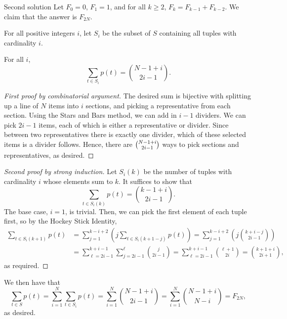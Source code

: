 \begin{customenv}{Second solution}
    Let $F_0=0$, $F_1=1$, and for all $k\ge 2$, $F_k=F_{k-1}+F_{k-2}$. We claim that the answer is $F_{2N}$.

    For all positive integers $i$, let $S_i$ be the subset of $S$ containing all tuples with cardinality $i$.
    \begin{iclaim*}
        For all $i$, \[\sum_{t\in S_i}p(t)=\binom{N-1+i}{2i-1}.\]
    \end{iclaim*}
    \begin{proof}[First proof by combinatorial argument]
        The desired sum is bijective with splitting up a line of $N$ items into $i$ sections, and picking a representative from each section. Using the Stars and Bars method, we can add in $i-1$ dividers. We can pick $2i-1$ items, each of which is either a representative or divider. Since between two representatives there is exactly one divider, which of these selected items is a divider follows. Hence, there are $\tbinom{N-1+i}{2i-1}$ ways to pick sections and representatives, as desired.
    \end{proof}
    \begin{proof}[Second proof by strong induction]
        Let $S_i(k)$ be the number of tuples with cardinality $i$ whose elements sum to $k$. It suffices to show that \[\sum_{t\in S_i(k)}p(t)=\binom{k-1+i}{2i-1}.\]
        The base case, $i=1$, is trivial. Then, we can pick the first element of each tuple first, so by the Hockey Stick Identity,
        \begin{align*}
            \sum_{t\in S_i(k+1)}p(t)&=\sum_{j=1}^{k-i+2}\left(j\sum_{t\in S_i(k+1-j)}p(t)\right)=\sum_{j=1}^{k-i+2}\left(j\binom{k+i-j}{2i-1}\right)\\
            &=\sum_{\ell=2i-1}^{k+i-1}\sum_{j=2i-1}^\ell\binom{j}{2i-1}=\sum_{\ell=2i-1}^{k+i-1}\binom{\ell+1}{2i}=\binom{k+1+i}{2i+1},
        \end{align*}
        as required.
    \end{proof}

    We then have that
    \[\sum_{t\in S}p(t)=\sum_{i=1}^{N}\sum_{t\in S_i}p(t)=\sum_{i=1}^{N}\binom{N-1+i}{2i-1}=\sum_{i=1}^{N}\binom{N-1+i}{N-i}=F_{2N},\]
    as desired.
\end{customenv}
